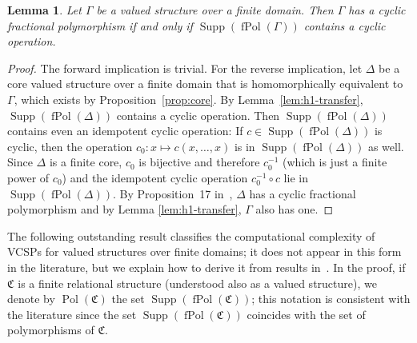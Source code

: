 \documentclass[nonacm]{acmart}
\newcommand{\bC}{{\mathfrak C}}
\DeclareMathOperator{\fPol}{fPol}
\DeclareMathOperator{\Pol}{Pol}
\DeclareMathOperator{\Sup}{Supp}
\newtheorem{lemma}[theorem]{Lemma}
\begin{document}
\begin{lemma}\label{lem:cyclic-supp}
Let $\Gamma$ be a valued structure over a finite domain. Then $\Gamma$ has a cyclic fractional polymorphism if and only if $\Sup(\fPol(\Gamma))$ contains a cyclic operation. 
\end{lemma}
\begin{proof}
The forward implication is trivial. For the reverse implication, let $\Delta$ be a core valued structure over a finite domain that is homomorphically equivalent to $\Gamma$, which exists by Proposition~\ref{prop:core}. By Lemma~\ref{lem:h1-transfer}, $\Sup(\fPol(\Delta))$ contains a cyclic operation. Then $\Sup(\fPol(\Delta))$ contains even an idempotent cyclic operation: If $c \in \Sup(\fPol(\Delta))$ is cyclic, then the operation $c_0 \colon x \mapsto c(x, \dots, x)$ is in $\Sup(\fPol(\Delta))$ as well. Since $\Delta$ is a finite core, $c_0$ is bijective and therefore $c_0^{-1}$ (which is just a finite power of $c_0$) and the idempotent cyclic operation $c_0^{-1} \circ c$ lie in $\Sup(\fPol(\Delta))$.
By  Proposition~17 in~\cite{KozikOchremiak15}, $\Delta$ has a cyclic fractional polymorphism and by Lemma \ref{lem:h1-transfer}, $\Gamma$ also has one.
\end{proof}

The following outstanding result classifies the computational complexity of VCSPs for valued structures over finite domains; it does not appear in this form in the literature, but
we explain
how to derive it from results in~\cite{KozikOchremiak15,KolmogorovKR17,BulatovFVConjecture,ZhukFVConjecture,Zhuk20}. 
In the proof, if $\bC$ is a finite relational structure (understood also as a valued structure), we denote by $\Pol(\bC)$ the set $\Sup(\fPol(\bC))$; this notation is consistent with the literature since the set $\Sup(\fPol(\bC))$ coincides with the set of polymorphisms of $\bC$.
\end{document}
